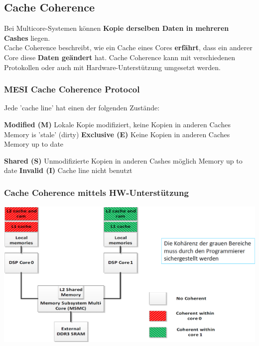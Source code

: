 \subsection{Cache Coherence}

Bei Multicore-Systemen können \textbf{Kopie derselben Daten in mehreren Cashes} liegen. \\
Cache Coherence beschreibt, wie ein Cache eines Cores \textbf{erfährt}, dass ein anderer Core diese \textbf{Daten geändert} hat. 
Cache Coherence kann mit verschiedenen Protokollen oder auch mit Hardware-Unterstützung umgesetzt werden.


\subsubsection{MESI Cache Coherence Protocol}

Jede 'cache line' hat einen der folgenden Zustände:

\vspace{0.1cm}

\begin{minipage}[t]{0.48\columnwidth}
    \raggedright
    \begin{outline}
        \1 \textbf{Modified (M)}
            \2 Lokale Kopie modifiziert, keine Kopien in anderen Caches
            \2 Memory is 'stale' (dirty)
        \1 \textbf{Exclusive (E)}
            \2 Keine Kopien in anderen Caches
            \2 Memory up to date
    \end{outline}
\end{minipage}
\hfill
\begin{minipage}[t]{0.48\columnwidth}
    \raggedright
    \begin{outline}
        \1 \textbf{Shared (S)}
            \2 Unmodifizierte Kopien in anderen Cashes möglich
            \2 Memory up to date
        \1 \textbf{Invalid (I)}
            \2 Cache line nicht benutzt
    \end{outline}
\end{minipage}


\subsubsection{Cache Coherence mittels HW-Unterstützung}

\includegraphics[width=\columnwidth]{images/multicore_cache_coherence_HW.png}


